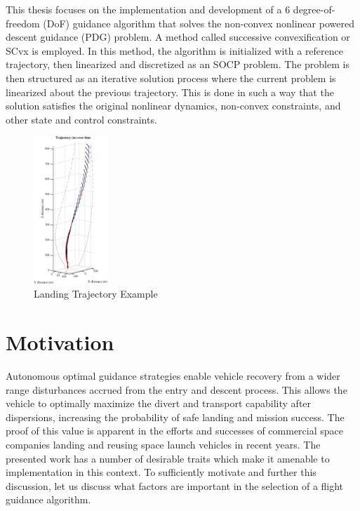 This thesis focuses on the implementation and development of a 6 degree-of-freedom (DoF) guidance algorithm that solves the non-convex nonlinear powered descent guidance (PDG) problem. A method called successive convexification or SCvx is employed. In this method, the algorithm is initialized with a reference trajectory, then linearized and discretized as an SOCP problem. The problem is then structured as an iterative solution process where the current problem is linearized about the previous trajectory. This is done in such a way that the solution satisfies the original nonlinear dynamics, non-convex constraints, and other state and control constraints. 
\begin{figure}[!htbp] 
  \centering
  \includegraphics[width=0.25\textwidth]{figs/3dtraj_intro.eps}
  \caption{Landing Trajectory Example}
  \label{fig:intro}
 \end{figure}	



\section{Motivation}
Autonomous optimal guidance strategies enable vehicle recovery from a wider range disturbances accrued from the entry and descent process. This allows the vehicle to optimally maximize the divert and transport capability after dispersions, increasing the probability of safe landing and mission success. The proof of this value is apparent in the efforts and successes of commercial space companies landing and reusing space launch vehicles in recent years. The presented work has a number of desirable traits which make it amenable to implementation in this context. To sufficiently motivate and further this discussion, let us discuss what factors are important in the selection of a flight guidance algorithm.



